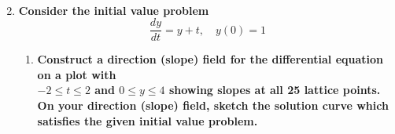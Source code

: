\documentclass[11pt]{article}
\begin{document}
\begin{enumerate}[label={\textbf{\arabic*.}}]
{\begin{enumerate}[label={\textbf{(\alph*)}}]
{\begin{align*}
                    \end{align*}
                }
            \end{enumerate}
        }
        \item{
            \textbf{\boldmath Consider the initial value problem $$\frac{dy}{dt}=y+t,\quad y(0)=1$$}
            \begin{enumerate}[label={\textbf{(\alph*)}}]
                \item{
                    \textbf{\boldmath Construct a direction (slope) field for the differential equation on a plot with\\$-2\le t\le2$ and $0\le y\le4$ showing slopes at all 25 lattice points. On your direction (slope) field, sketch the solution curve which satisfies the given initial value problem.}
                }
            \end{enumerate}
        }
    \end{enumerate}
\end{document}
